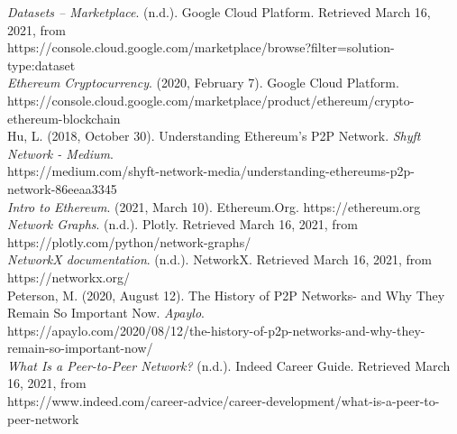 \documentclass[fontsize=11pt]{article}
\begin{document}
\begin{hangparas}{.25in}{1}

\textit{Datasets – Marketplace}. (n.d.). Google Cloud Platform. Retrieved March 16, 2021, from \\ https://console.cloud.google.com/marketplace/browse?filter=solution-type:dataset \\

\textit{Ethereum Cryptocurrency}. (2020, February 7). Google Cloud Platform. \\ https://console.cloud.google.com/marketplace/product/ethereum/crypto-ethereum-blockchain \\

Hu, L. (2018, October 30). Understanding Ethereum’s P2P Network. \textit{Shyft Network - Medium}. \\ https://medium.com/shyft-network-media/understanding-ethereums-p2p-network-86eeaa3345 \\

\textit{Intro to Ethereum}. (2021, March 10). Ethereum.Org. https://ethereum.org \\

\textit{Network Graphs}. (n.d.). Plotly. Retrieved March 16, 2021, from https://plotly.com/python/network-graphs/ \\

\textit{NetworkX documentation}. (n.d.). NetworkX. Retrieved March 16, 2021, from https://networkx.org/ \\

Peterson, M. (2020, August 12). The History of P2P Networks- and Why They Remain So Important Now. \textit{Apaylo}.\\ 
https://apaylo.com/2020/08/12/the-history-of-p2p-networks-and-why-they-remain-so-important-now/ \\

\textit{What Is a Peer-to-Peer Network?} (n.d.). Indeed Career Guide. Retrieved March 16, 2021, from \\ https://www.indeed.com/career-advice/career-development/what-is-a-peer-to-peer-network


\end{hangparas}

\end{document}
